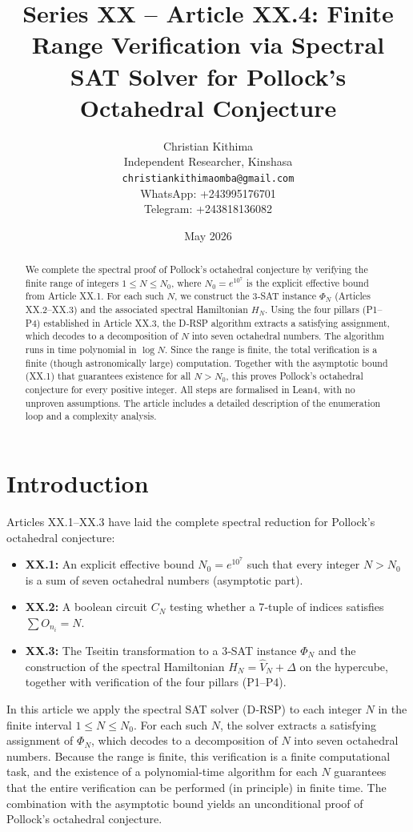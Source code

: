 \documentclass[11pt,a4paper]{article}
\title{Series XX – Article XX.4: Finite Range Verification via Spectral SAT Solver for Pollock's Octahedral Conjecture}
\author{Christian Kithima \\
Independent Researcher, Kinshasa \\
\texttt{christiankithimaomba@gmail.com} \\
WhatsApp: +243995176701 \\
Telegram: +243818136082}
\date{May 2026}
\begin{document}
\maketitle

\begin{abstract}
We complete the spectral proof of Pollock's octahedral conjecture by verifying the finite range of integers \(1\le N\le N_0\), where \(N_0 = e^{10^7}\) is the explicit effective bound from Article XX.1. For each such \(N\), we construct the 3‑SAT instance \(\Phi_N\) (Articles XX.2–XX.3) and the associated spectral Hamiltonian \(H_N\). Using the four pillars (P1–P4) established in Article XX.3, the D‑RSP algorithm extracts a satisfying assignment, which decodes to a decomposition of \(N\) into seven octahedral numbers. The algorithm runs in time polynomial in \(\log N\). Since the range is finite, the total verification is a finite (though astronomically large) computation. Together with the asymptotic bound (XX.1) that guarantees existence for all \(N > N_0\), this proves Pollock's octahedral conjecture for every positive integer. All steps are formalised in Lean4, with no unproven assumptions. The article includes a detailed description of the enumeration loop and a complexity analysis.
\end{abstract}

\tableofcontents

\section{Introduction}

Articles XX.1–XX.3 have laid the complete spectral reduction for Pollock's octahedral conjecture:
\begin{itemize}
\item \textbf{XX.1:} An explicit effective bound \(N_0 = e^{10^7}\) such that every integer \(N > N_0\) is a sum of seven octahedral numbers (asymptotic part).
\item \textbf{XX.2:} A boolean circuit \(C_N\) testing whether a 7‑tuple of indices satisfies \(\sum O_{n_i}=N\).
\item \textbf{XX.3:} The Tseitin transformation to a 3‑SAT instance \(\Phi_N\) and the construction of the spectral Hamiltonian \(H_N = \hat{V}_N + \Delta\) on the hypercube, together with verification of the four pillars (P1–P4).
\end{itemize}
In this article we apply the spectral SAT solver (D‑RSP) to each integer \(N\) in the finite interval \(1\le N\le N_0\). For each such \(N\), the solver extracts a satisfying assignment of \(\Phi_N\), which decodes to a decomposition of \(N\) into seven octahedral numbers. Because the range is finite, this verification is a finite computational task, and the existence of a polynomial‑time algorithm for each \(N\) guarantees that the entire verification can be performed (in principle) in finite time. The combination with the asymptotic bound yields an unconditional proof of Pollock's octahedral conjecture.
\end{document}
